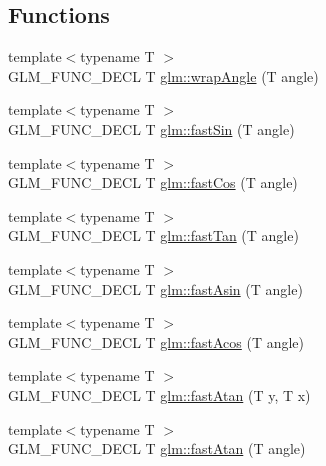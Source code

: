 \subsection*{Functions}
\begin{DoxyCompactItemize}
\item 
{\footnotesize template$<$typename T $>$ }\\G\+L\+M\+\_\+\+F\+U\+N\+C\+\_\+\+D\+E\+CL T \hyperlink{group__gtx__fast__trigonometry_ga069527c6dbd64f53435b8ebc4878b473}{glm\+::wrap\+Angle} (T angle)
\item 
{\footnotesize template$<$typename T $>$ }\\G\+L\+M\+\_\+\+F\+U\+N\+C\+\_\+\+D\+E\+CL T \hyperlink{group__gtx__fast__trigonometry_ga0aab3257bb3b628d10a1e0483e2c6915}{glm\+::fast\+Sin} (T angle)
\item 
{\footnotesize template$<$typename T $>$ }\\G\+L\+M\+\_\+\+F\+U\+N\+C\+\_\+\+D\+E\+CL T \hyperlink{group__gtx__fast__trigonometry_gab34c8b45c23c0165a64dcecfcc3b302a}{glm\+::fast\+Cos} (T angle)
\item 
{\footnotesize template$<$typename T $>$ }\\G\+L\+M\+\_\+\+F\+U\+N\+C\+\_\+\+D\+E\+CL T \hyperlink{group__gtx__fast__trigonometry_gaf29b9c1101a10007b4f79ee89df27ba2}{glm\+::fast\+Tan} (T angle)
\item 
{\footnotesize template$<$typename T $>$ }\\G\+L\+M\+\_\+\+F\+U\+N\+C\+\_\+\+D\+E\+CL T \hyperlink{group__gtx__fast__trigonometry_ga562cb62c51fbfe7fac7db0bce706b81f}{glm\+::fast\+Asin} (T angle)
\item 
{\footnotesize template$<$typename T $>$ }\\G\+L\+M\+\_\+\+F\+U\+N\+C\+\_\+\+D\+E\+CL T \hyperlink{group__gtx__fast__trigonometry_ga9721d63356e5d94fdc4b393a426ab26b}{glm\+::fast\+Acos} (T angle)
\item 
{\footnotesize template$<$typename T $>$ }\\G\+L\+M\+\_\+\+F\+U\+N\+C\+\_\+\+D\+E\+CL T \hyperlink{group__gtx__fast__trigonometry_ga8d197c6ef564f5e5d59af3b3f8adcc2c}{glm\+::fast\+Atan} (T y, T x)
\item 
{\footnotesize template$<$typename T $>$ }\\G\+L\+M\+\_\+\+F\+U\+N\+C\+\_\+\+D\+E\+CL T \hyperlink{group__gtx__fast__trigonometry_gae25de86a968490ff56856fa425ec9d30}{glm\+::fast\+Atan} (T angle)
\end{DoxyCompactItemize}


